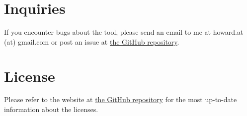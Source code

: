 \documentclass[12pt,a4paper]{article}
\begin{document}
\section{Inquiries}

If you encounter bugs about the tool, please send an email to me at howard.at (at) gmail.com or post an issue at \href{https://github.com/howardcheung/data-preprocessing-helper/}{the GitHub repository}.

\section{License}

Please refer to the website at \href{https://github.com/howardcheung/data-preprocessing-helper/}{the GitHub repository} for the most up-to-date information about the licenses.
\end{document}
